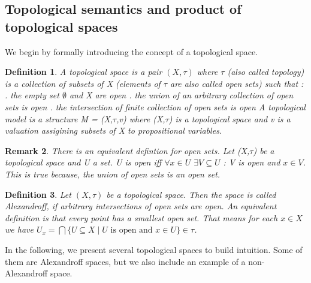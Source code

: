 \documentclass[12pt, a4paper]{scrartcl}
\newtheorem{definition}{Definition}[subsection]
\newtheorem{remark}[definition]{Remark}
\begin{document}
\subsection{Topological semantics and product of topological spaces}
We begin by formally introducing the concept of a topological space.
\begin{definition}
    A topological space is a pair $(X, \tau)$ where $\tau$ (also called topology) is a collection of subsets of X (elements of $\tau$ are also called open sets) such that : 
    \newline
    . the empty set $\emptyset $ and X are open
    . the union of an arbitrary collection of open sets is open
    . the intersection of finite collection of open sets is open
    \newline
    \newline
    A topological model is a structure M = (X,$\tau$,v) where (X,$\tau$) is a topological space
    and v is a valuation assigining subsets of X to propositional variables. 
        
\end{definition}

\begin{remark}

    There is an equivalent defintion for open sets. Let (X,$\tau$) be a topological space and U a set.
    U is open iff $\forall x \in U$  $\exists V\subseteq U$ : V is open and $x \in V$. This is true because,
    the union of open sets is an open set.
    
\end{remark}

\begin{definition}
    Let $(X,\tau)$ be a topological space. Then the space is called Alexandroff, if arbitrary intersections of open sets are open.
    An equivalent definition is that every point has a smallest open set. That means for each $x \in X$ we have 
    $U_x = \bigcap \{U \subseteq X \mid U \mbox{ is open  and } x \in U\} \in \tau$.
\end{definition}

In the following, we present several topological spaces to build intuition. Some of them are Alexandroff spaces, but we also include an example of a non-Alexandroff space.
\end{document}
